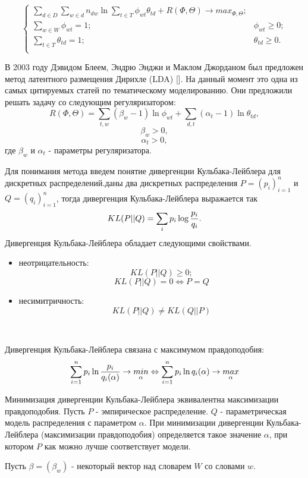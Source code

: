$$ 
\begin{cases}
    \sum_{d \in D} \sum_{w \in d} n_{dw} \ln{\sum_{t \in T} \phi_{wt} \theta_{td} } + R(\Phi,\Theta) \rightarrow max_{\Phi,\Theta};\\
    \sum_{w \in W}\phi_{wt} = 1; &\phi_{wt} \ge 0;\\
    \sum_{t \in T}\theta_{td} = 1; &\theta_{td} \ge 0.\\
\end{cases}
$$

В 2003 году Дэвидом Блеем, Эндрю Энджи и Маклом Джорданом был предложен метод латентного размещения Дирихле (LDA) [\todo{}]. На данный момент это одна из самых цитируемых статей по тематическому моделированию. Они предложили решать задачу со следующим регуляризатором:
$$
R(\Phi,\Theta) = \sum_{t,w}{(\beta_w-1)\ln{\phi_{wt}}} + \sum_{d,t}{(\alpha_t-1)\ln{\theta_{td}}},
$$
$$
\beta_w > 0, 
$$
$$
\alpha_t > 0,
$$
где $\beta_w$ и $\alpha_t$ - параметры регуляризатора.

Для понимания метода введем понятие дивергенции Кульбака-Лейблера для дискретных распределений. даны два дискретных распределения $P=(p_i)_{i=1}^n$ и $Q=(q_i)_{i=1}^n$, тогда дивергенция Кульбака-Лейблера выражается так
$$
KL(P||Q)=\sum_i{p_i \log{{p_i}\over{q_i}}}.
$$
Дивергенция Кульбака-Лейблера обладает следующими свойствами.

\begin{itemize}
    \item неотрицательность:
        $$
        KL(P||Q)\ge 0;
        $$
        $$
        KL(P||Q)=0 \Leftrightarrow P=Q
        $$
    \item несимитричность:
        $$
        KL(P||Q)\neq KL(Q||P)
        $$
\end{itemize}

~\

Дивергенция Кульбака-Лейблера связана с максимумом правдоподобия:
$$
\sum_{i=1}^{n}p_i\ln{p_i \over {q_i(\alpha)}} \rightarrow \underset{\alpha}{min} \Leftrightarrow \sum_{i=1}^{n}p_i\ln{q_i(\alpha)} \rightarrow \underset{\alpha}{max}
$$

Минимизация дивергенции Кульбака-Лейблера эквивалентна максимизации правдоподобия. Пусть $P$ - эмпирическое распределение. $Q$ - параметрическая модель распределения с параметром $\alpha$. При минимизации дивергенции Кульбака-Лейблера (максимизации правдоподобия) определяется такое значение $\alpha$, при котором $P$ как можно лучше соответствует модели.

Пусть $\beta=(\beta_w)$ - некоторый вектор над словарем $W$ со словами $w$.

